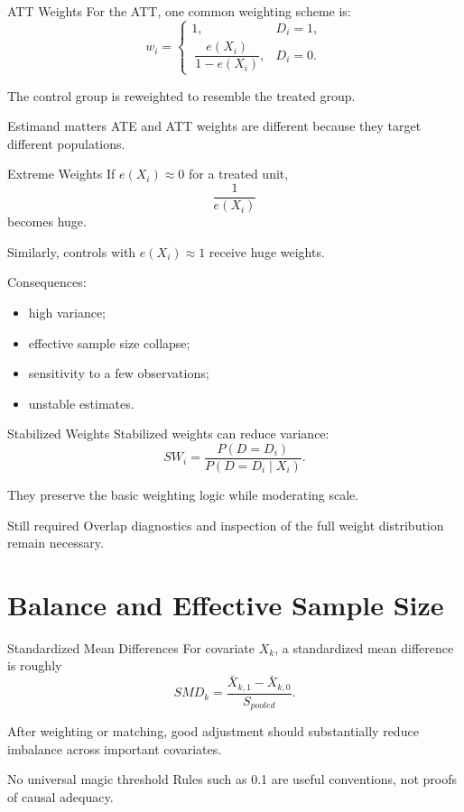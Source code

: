 \documentclass[aspectratio=169,11pt]{beamer}
\begin{document}
\begin{frame}{ATT Weights}
For the ATT, one common weighting scheme is:
\[
w_i=
\begin{cases}
1, & D_i=1, \\\
\dfrac{e(X_i)}{1-e(X_i)}, & D_i=0.
\end{cases}
\]

The control group is reweighted to resemble the treated group.

\begin{alertblock}{Estimand matters}
ATE and ATT weights are different because they target different populations.
\end{alertblock}
\end{frame}

\begin{frame}{Extreme Weights}
If \(e(X_i)\approx 0\) for a treated unit,
\[
\frac{1}{e(X_i)}
\]
becomes huge.

Similarly, controls with \(e(X_i)\approx 1\) receive huge weights.

Consequences:
\begin{itemize}
\item high variance;
\item effective sample size collapse;
\item sensitivity to a few observations;
\item unstable estimates.
\end{itemize}
\end{frame}

\begin{frame}{Stabilized Weights}
Stabilized weights can reduce variance:
\[
SW_i=
\frac{P(D=D_i)}
{P(D=D_i\mid X_i)}.
\]

They preserve the basic weighting logic while moderating scale.

\begin{block}{Still required}
Overlap diagnostics and inspection of the full weight distribution remain necessary.
\end{block}
\end{frame}

\section{Balance and Effective Sample Size}

\begin{frame}{Standardized Mean Differences}
For covariate \(X_k\), a standardized mean difference is roughly
\[
SMD_k
=
\frac{\bar X_{k,1}-\bar X_{k,0}}
{S_{pooled}}.
\]

After weighting or matching, good adjustment should substantially reduce imbalance across important covariates.

\begin{alertblock}{No universal magic threshold}
Rules such as 0.1 are useful conventions, not proofs of causal adequacy.
\end{alertblock}
\end{frame}
\end{document}
